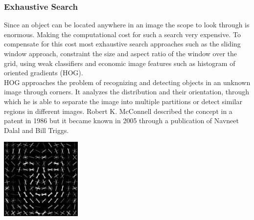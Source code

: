 \subsubsection{Exhaustive Search}
Since an object can be located anywhere in an image the scope to look through is enormous. Making the computational cost for such a search very
expensive. To compensate for this cost most exhaustive search approaches such as the sliding window approach, constraint the size and aspect
ratio of the window over the grid, using weak classifiers and economic image features such as histogram of oriented gradients
(HOG).\cite{selectivesearch} \\ 
HOG approaches the problem of recognizing and detecting objects in an unknown image through corners. It analyzes the distribution and their
orientation, through which he is able to separate the image into multiple partitions or detect similar regions in different images.
\newpage \noindent
Robert K. McConnell described the concept in a patent in 1986 but it became known in 2005 through a publication of Navneet Dalal and Bill
Triggs.\cite{hog}
\begin{center}
    \includegraphics[width=0.3\textwidth]{images/object_detection/Dlib_Learned-HOG-Detector.jpg} \cite{hog}
\end{center}

